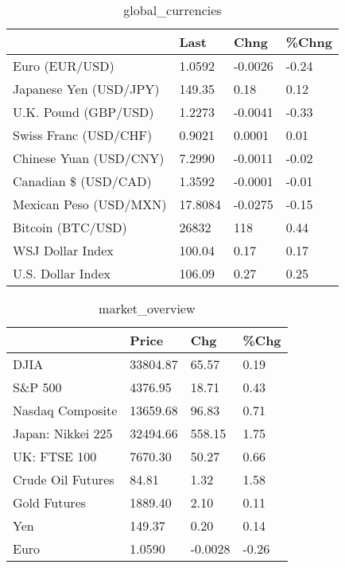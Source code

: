 \documentclass{article}%
\begin{document}
%


\begin{table}[htbp]%
\caption{global\_currencies}%
\centering%
\begin{adjustbox}{width=1\textwidth}%
\begin{tabular}{llll}
\toprule
                       &    Last &    Chng & \%Chng \\
\midrule
        Euro (EUR/USD) &  1.0592 & -0.0026 & -0.24 \\
Japanese Yen (USD/JPY) &  149.35 &    0.18 &  0.12 \\
  U.K. Pound (GBP/USD) &  1.2273 & -0.0041 & -0.33 \\
 Swiss Franc (USD/CHF) &  0.9021 &  0.0001 &  0.01 \\
Chinese Yuan (USD/CNY) &  7.2990 & -0.0011 & -0.02 \\
  Canadian \$ (USD/CAD) &  1.3592 & -0.0001 & -0.01 \\
Mexican Peso (USD/MXN) & 17.8084 & -0.0275 & -0.15 \\
     Bitcoin (BTC/USD) &   26832 &     118 &  0.44 \\
      WSJ Dollar Index &  100.04 &    0.17 &  0.17 \\
     U.S. Dollar Index &  106.09 &    0.27 &  0.25 \\
\bottomrule
\end{tabular}
%
\end{adjustbox}%
\end{table}

%


\begin{table}[htbp]%
\caption{market\_overview}%
\centering%
\begin{adjustbox}{width=1\textwidth}%
\begin{tabular}{llll}
\toprule
                  &    Price &     Chg &  \%Chg \\
\midrule
             DJIA & 33804.87 &   65.57 &  0.19 \\
          S\&P 500 &  4376.95 &   18.71 &  0.43 \\
 Nasdaq Composite & 13659.68 &   96.83 &  0.71 \\
Japan: Nikkei 225 & 32494.66 &  558.15 &  1.75 \\
     UK: FTSE 100 &  7670.30 &   50.27 &  0.66 \\
Crude Oil Futures &    84.81 &    1.32 &  1.58 \\
     Gold Futures &  1889.40 &    2.10 &  0.11 \\
              Yen &   149.37 &    0.20 &  0.14 \\
             Euro &   1.0590 & -0.0028 & -0.26 \\
\bottomrule
\end{tabular}
%
\end{adjustbox}%
\end{table}

%
\end{document}
